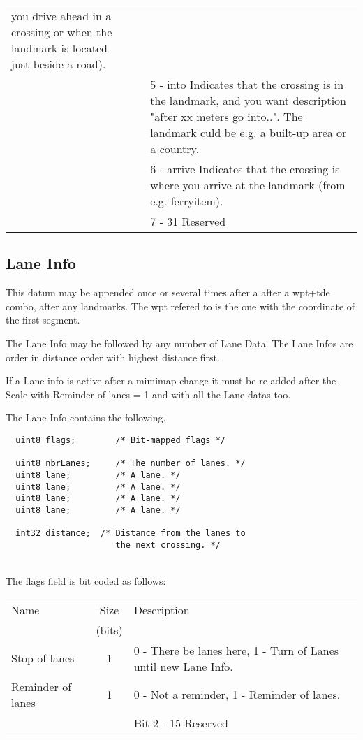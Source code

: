 \documentclass[a4paper]{article}
\begin{document}
\begin{centering}
\begin{tabular}{|l|c|p{7cm}|}
                            you drive ahead in a crossing or when the landmark 
                            is located just beside a road).\\
      &          & 5 - into Indicates that the crossing is in the landmark, and
                            you want description "after xx meters go into..". 
                            The landmark culd be e.g. a built-up area or a
                            country.\\
      &          & 6 - arrive  Indicates that the crossing is where you arrive 
                               at the landmark (from e.g. ferryitem).\\
      &          & 7 - 31 Reserved \\\hline
\end{tabular}
\end{centering}


\subsection{Lane Info}
\label{Lane Info}

This datum may be appended once or several times after a after a 
wpt+tde combo, after any landmarks. The wpt refered to is the one 
with the coordinate of the first segment.

The Lane Info may be followed by any number of Lane Data.
The Lane Infos are order in distance order with highest distance first.

If a Lane info is active after a mimimap change it must be re-added after the
Scale with Reminder of lanes = 1 and with all the Lane datas too.

The Lane Info contains the following.
\begin{verbatim}
  uint8 flags;        /* Bit-mapped flags */

  uint8 nbrLanes;     /* The number of lanes. */
  uint8 lane;         /* A lane. */
  uint8 lane;         /* A lane. */
  uint8 lane;         /* A lane. */
  uint8 lane;         /* A lane. */

  int32 distance;  /* Distance from the lanes to 
                      the next crossing. */
\end{verbatim}

\ \\
The flags field is bit coded as follows:

\begin{centering}
\begin{tabular}{|l|c|p{7cm}|}
\hline
Name  & Size     & Description \\
      & (bits)   &             \\\hline
Stop of lanes    & 1         & 0 - There be lanes here, 1 - Turn of Lanes until new Lane Info. \\\hline
Reminder of lanes    & 1         & 0 - Not a reminder, 1 - Reminder of lanes. \\\hline
      &          & Bit 2 - 15 Reserved \\\hline
\end{tabular}
\end{centering}
\end{document}
